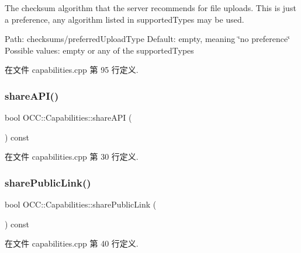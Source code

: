 The checksum algorithm that the server recommends for file uploads. This is just a preference, any algorithm listed in supported\+Types may be used.

Path\+: checksums/preferred\+Upload\+Type Default\+: empty, meaning \char`\"{}no preference\char`\"{} Possible values\+: empty or any of the supported\+Types 

在文件 capabilities.\+cpp 第 95 行定义.

\mbox{\label{class_o_c_c_1_1_capabilities_af4d6d69d313737bb9659e99e88141ee8}} 
\subsubsection{\texorpdfstring{share\+A\+P\+I()}{shareAPI()}}
{\footnotesize\ttfamily bool O\+C\+C\+::\+Capabilities\+::share\+A\+PI (\begin{DoxyParamCaption}{ }\end{DoxyParamCaption}) const}



在文件 capabilities.\+cpp 第 30 行定义.

\mbox{\label{class_o_c_c_1_1_capabilities_a1d994004275deb19b37d3282e1d9f0e0}} 
\subsubsection{\texorpdfstring{share\+Public\+Link()}{sharePublicLink()}}
{\footnotesize\ttfamily bool O\+C\+C\+::\+Capabilities\+::share\+Public\+Link (\begin{DoxyParamCaption}{ }\end{DoxyParamCaption}) const}



在文件 capabilities.\+cpp 第 40 行定义.

\mbox{\label{class_o_c_c_1_1_capabilities_a91319b7715e1fcb446da3d17e203e89e}} 
